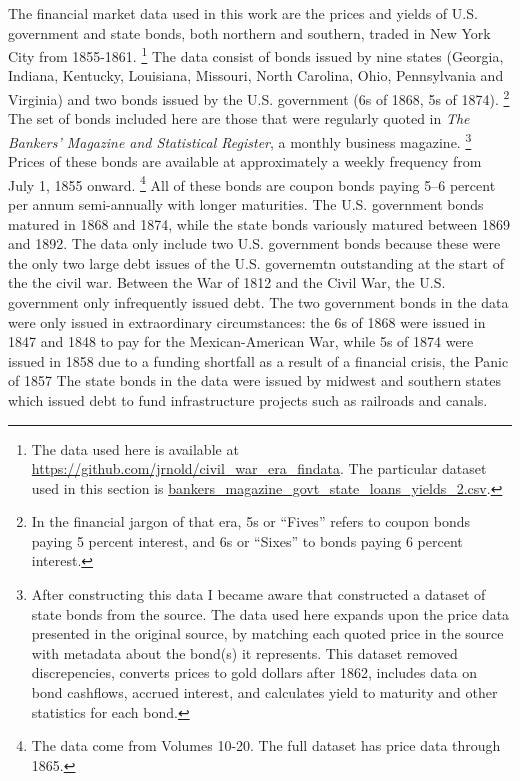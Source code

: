 \documentclass[11pt, oneside, article]{memoir}\usepackage[]{graphicx}\usepackage[]{color}
\begin{document}
The financial market data used in this work are the prices and yields of U.S. government and state bonds, both northern and southern, traded in New York City from 1855-1861.%
\footnote{
  The data used here is available at \url{https://github.com/jrnold/civil_war_era_findata}.
  The particular dataset used in this section is \href{https://github.com/jrnold/civil_war_era_findata/blob/master/data/bankers_magazine_govt_state_loans_yields_2.csv}{bankers\_magazine\_govt\_state\_loans\_yields\_2.csv}.
}
The data consist of bonds issued by nine states (Georgia, Indiana, Kentucky, Louisiana, Missouri, North Carolina, Ohio, Pennsylvania and Virginia) and two bonds issued by the U.S. government (6s of 1868, 5s of 1874).%
\footnote{In the financial jargon of that era, 5s or ``Fives'' refers to coupon bonds paying 5 percent interest, and 6s or ``Sixes'' to bonds paying 6 percent interest.}
The set of bonds included here are those that were regularly quoted in \textit{The Bankers' Magazine and Statistical Register}, a monthly business magazine.
\footnote{After constructing this data I became aware that \textcite{DwyerHaferWeber1999} constructed a dataset of state bonds from the source.
  The data used here expands upon the price data presented in the original source, by matching each quoted price in the source with metadata about the bond(s) it represents.
  This dataset removed discrepencies, converts prices to gold dollars after 1862, includes data on bond cashflows, accrued interest, and calculates yield to maturity and other statistics for each bond.
}
Prices of these bonds are available at approximately a weekly frequency from July  1, 1855 onward.
\footnote{The data come from Volumes 10-20. The full dataset has price data through 1865.}
All of these bonds are coupon bonds paying 5--6 percent per annum semi-annually with longer maturities.
The U.S. government bonds matured in 1868 and 1874, while the state bonds variously matured between 1869 and 1892.%
The data only include two U.S. government bonds because these were the only two large debt issues of the U.S. governemtn outstanding at the start of the the civil war.%
Between the War of 1812 and the Civil War, the U.S. government only infrequently issued debt.
The two government bonds  in the data were only issued in extraordinary circumstances: the 6s of 1868 were issued in 1847 and 1848 to pay for the Mexican-American War, while 5s of 1874 were issued in 1858 due to a funding shortfall as a result of a financial crisis, the Panic of 1857  \parencites[297-302]{HomerSylla2005}[72-73,76]{DeKnight1900}
The state bonds in the data were issued by midwest and southern states which issued debt to fund infrastructure projects such as railroads and canals.
\end{document}
